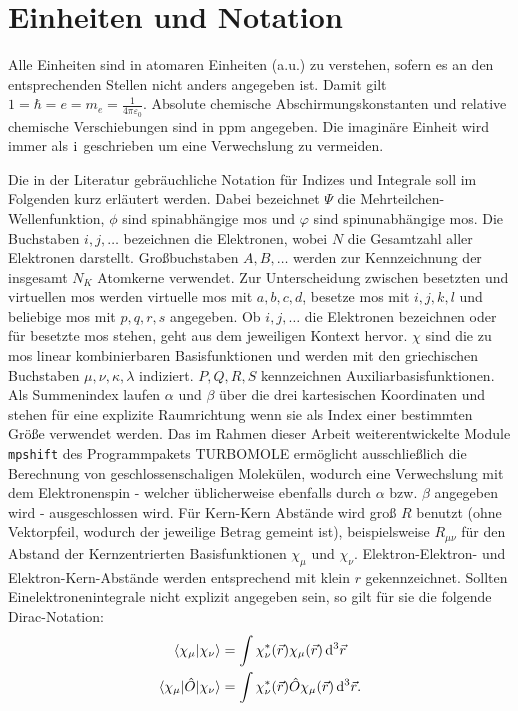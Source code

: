\section{Einheiten und Notation}

Alle Einheiten sind in atomaren Einheiten (a.u.) zu verstehen, sofern es an den entsprechenden Stellen nicht anders angegeben ist. Damit gilt $1=\hbar=e=m_e=\frac{1}{4\pi\varepsilon_0}$.
Absolute chemische Abschirmungskonstanten und relative chemische Verschiebungen sind in \unit{ppm} angegeben. Die imaginäre Einheit wird immer als $\mathrm{i}\mkern1mu$ geschrieben um eine Verwechslung zu vermeiden.
 
\bigskip
Die in der Literatur gebräuchliche Notation für Indizes und Integrale soll im Folgenden kurz erläutert werden. Dabei bezeichnet $\Psi$ die Mehrteilchen-Wellenfunktion, $\phi$ sind spinabhängige \acp{mo} und $\varphi$ sind spinunabhängige \acp{mo}. Die Buchstaben $i,j,\dotsc$ bezeichnen die Elektronen, wobei $N$ die Gesamtzahl aller Elektronen darstellt. Großbuchstaben $A,B,\dotsc$ werden zur Kennzeichnung der insgesamt $N_K$ Atomkerne verwendet. Zur Unterscheidung zwischen besetzten und virtuellen \acp{mo} werden virtuelle \acp{mo} mit $a,b,c,d$, besetze \acp{mo} mit $i,j,k,l$ und beliebige \acp{mo} mit $p,q,r,s$ angegeben. Ob $i,j,\dotsc$ die Elektronen bezeichnen oder für besetzte \acp{mo} stehen, geht aus dem jeweiligen Kontext hervor. $\chi$ sind die zu \acp{mo} linear kombinierbaren Basisfunktionen und werden mit den griechischen Buchstaben $\mu,\nu,\kappa,\lambda$ indiziert. $P,Q,R,S$ kennzeichnen Auxiliarbasisfunktionen. Als Summenindex laufen $\alpha$ und $\beta$ über die drei kartesischen Koordinaten und stehen für eine explizite Raumrichtung wenn sie als Index einer bestimmten Größe verwendet werden. Das im Rahmen dieser Arbeit weiterentwickelte Module \texttt{mpshift} des Programmpakets \textsc{TURBOMOLE} ermöglicht ausschließlich die Berechnung von geschlossenschaligen Molekülen, wodurch eine Verwechslung mit dem Elektronenspin - welcher üblicherweise ebenfalls durch $\alpha$ bzw. $\beta$ angegeben wird - ausgeschlossen wird. Für Kern-Kern Abstände wird groß $R$ benutzt (ohne Vektorpfeil, wodurch der jeweilige Betrag gemeint ist), beispielsweise $R_{\mu\nu}$ für den Abstand der Kernzentrierten Basisfunktionen $\chi_\mu$ und $\chi_\nu$. Elektron-Elektron- und Elektron-Kern-Abstände werden entsprechend mit klein $r$ gekennzeichnet.
\newpage
Sollten Einelektronenintegrale nicht explizit angegeben sein, so gilt für sie die folgende Dirac-Notation:
\begin{gather*}
	\langle\chi_\mu\vert\chi_\nu\rangle=\int\chi_\nu^*(\vec{r})\chi_\mu(\vec{r})\mathop{}\!\mathrm{d^3}\vec{r}\\
	\langle\chi_\mu\vert\hat O\vert\chi_\nu\rangle=\int\chi_\nu^*(\vec{r})\hat O\chi_\mu(\vec{r})\mathop{}\!\mathrm{d^3}\vec{r}.
\end{gather*}

